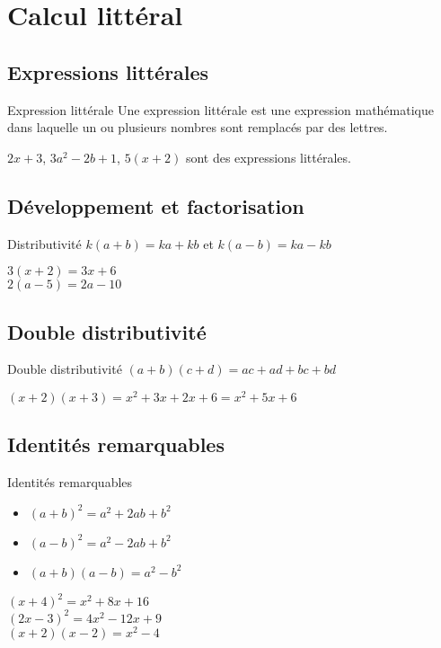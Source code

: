 \chapter{Calcul littéral}

\section{Expressions littérales}
\begin{definition}{Expression littérale}
Une expression littérale est une expression mathématique dans laquelle un ou plusieurs nombres sont remplacés par des lettres.
\end{definition}

\begin{exemple}
$2x + 3$, $3a^2 - 2b + 1$, $5(x + 2)$ sont des expressions littérales.
\end{exemple}

\section{Développement et factorisation}
\begin{propriete}{Distributivité}
$k(a + b) = ka + kb$ et $k(a - b) = ka - kb$
\end{propriete}

\begin{exemple}
$3(x + 2) = 3x + 6$\\
$2(a - 5) = 2a - 10$
\end{exemple}

\section{Double distributivité}
\begin{propriete}{Double distributivité}
$(a + b)(c + d) = ac + ad + bc + bd$
\end{propriete}

\begin{exemple}
$(x + 2)(x + 3) = x^2 + 3x + 2x + 6 = x^2 + 5x + 6$
\end{exemple}

\section{Identités remarquables}
\begin{propriete}{Identités remarquables}
\begin{itemize}
    \item $(a + b)^2 = a^2 + 2ab + b^2$
    \item $(a - b)^2 = a^2 - 2ab + b^2$
    \item $(a + b)(a - b) = a^2 - b^2$
\end{itemize}
\end{propriete}

\begin{exemple}
$(x + 4)^2 = x^2 + 8x + 16$\\
$(2x - 3)^2 = 4x^2 - 12x + 9$\\
$(x + 2)(x - 2) = x^2 - 4$
\end{exemple} 